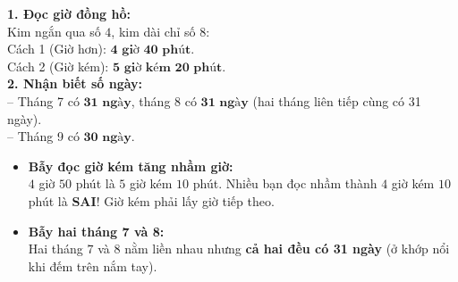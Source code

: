 \documentclass[11pt,a4paper]{article}
\begin{document}
\vspace{-2.5mm}
\noindent
\begin{minipage}[t]{0.49\textwidth}\vspace{0pt}
\begin{tcolorbox}[
  enhanced,
  colback=green!4!white,
  colframe=green!60!black,
  arc=2mm, boxrule=0.8pt,
  left=2mm, right=2mm, top=1.8mm, bottom=1.8mm,
  title={\footnotesize\bfseries\color{white}\faCheckCircle\ Ví dụ thực hành chuẩn mực}
]
{\footnotesize
\textbf{1. Đọc giờ đồng hồ:}\\
Kim ngắn qua số $4$, kim dài chỉ số $8$:\\
Cách 1 (Giờ hơn): $\mathbf{4\text{ giờ } 40\text{ phút}}$.\\
Cách 2 (Giờ kém): $\mathbf{5\text{ giờ kém } 20\text{ phút}}$.\\
\textbf{2. Nhận biết số ngày:}\\
-- Tháng 7 có $\mathbf{31\text{ ngày}}$, tháng 8 có $\mathbf{31\text{ ngày}}$ (hai tháng liên tiếp cùng có 31 ngày).\\
-- Tháng 9 có $\mathbf{30\text{ ngày}}$.
}
\end{tcolorbox}
\end{minipage}
\hfill
\begin{minipage}[t]{0.49\textwidth}\vspace{0pt}
\begin{tcolorbox}[
  enhanced,
  colback=red!4!white,
  colframe=red!70!black,
  arc=2mm, boxrule=0.8pt,
  left=2mm, right=2mm, top=1.8mm, bottom=1.8mm,
  title={\footnotesize\bfseries\color{white}\faExclamationTriangle\ Mẹo tránh bẫy trắc nghiệm}
]
{\footnotesize
\begin{itemize}\setlength{\itemsep}{1.5pt}\setlength{\leftskip}{-2.5mm}
  \item \textbf{Bẫy đọc giờ kém tăng nhầm giờ:}\\
  $4$ giờ $50$ phút là $5$ giờ kém $10$ phút. Nhiều bạn đọc nhầm thành $4$ giờ kém $10$ phút là \textbf{SAI}! Giờ kém phải lấy giờ tiếp theo.
  \item \textbf{Bẫy hai tháng 7 và 8:}\\
  Hai tháng $7$ và $8$ nằm liền nhau nhưng \textbf{cả hai đều có 31 ngày} (ở khớp nổi khi đếm trên nắm tay).
\end{itemize}
}
\end{tcolorbox}
\end{minipage}
\end{document}

